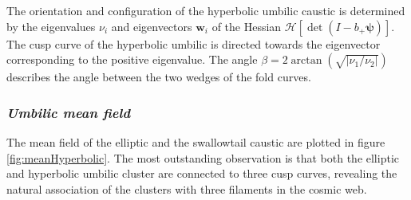 \documentclass[a4paper, 11pt]{article}
\begin{document}
The orientation and configuration of the hyperbolic umbilic caustic is determined by the eigenvalues $\nu_i$ and eigenvectors $\bm{w}_i$ of the Hessian $\mathcal{H}\left[\det (I- b_+ \bm{\psi})\right]$. The cusp curve of the hyperbolic umbilic is directed towards the eigenvector corresponding to the positive eigenvalue. The angle $\beta = 2 \arctan(\sqrt{|\nu_1/\nu_2|})$ describes the angle between the two wedges of the fold curves. 

\subsubsection{{\it Umbilic mean field}}
The mean field of the elliptic and the swallowtail caustic are plotted in figure \ref{fig:meanHyperbolic}. The most outstanding observation is that both the elliptic and hyperbolic umbilic cluster are connected to three cusp curves, revealing the natural association of the clusters with three filaments in the cosmic web.
\end{document}

